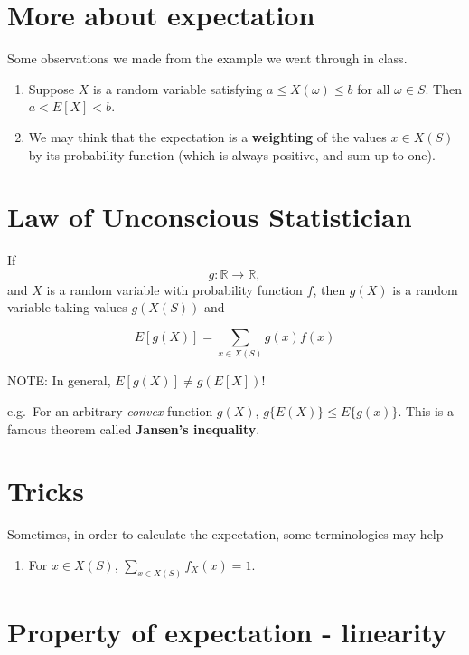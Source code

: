 \documentclass[
]{book}
\providecommand{\tightlist}{%
  \setlength{\itemsep}{0pt}\setlength{\parskip}{0pt}}
\theoremstyle{definition}
\theoremstyle{definition}
\theoremstyle{definition}
\theoremstyle{definition}
\theoremstyle{remark}
\begin{document}
\hypertarget{more-about-expectation}{%
\section{More about expectation}\label{more-about-expectation}}

Some observations we made from the example we went through in class.

\begin{enumerate}
\def\labelenumi{\arabic{enumi}.}
\item
  Suppose \(X\) is a random variable satisfying \(a \le X(\omega) \le b\) for all \(\omega \in S\). Then \(a<E[X]<b\).
\item
  We may think that the expectation is a \textbf{weighting} of the values \(x\in X(S)\) by its probability function (which is always positive, and sum up to one).
\end{enumerate}

\hypertarget{law-of-unconscious-statistician}{%
\section{Law of Unconscious Statistician}\label{law-of-unconscious-statistician}}

If
\[
g: {\mathbb R} \to {\mathbb R},
\]
and \(X\) is a random variable with probability function \(f\), then \(g(X)\) is a random variable taking values \(g(X(S))\) and

\[
E[g(X)] = \sum_{x \in X(S)} g(x) f(x)
\]

NOTE: In general, \(E[g(X)]\ne g(E[X])\)!

e.g.~For an arbitrary \emph{convex} function \(g(X)\), \(g\{E(X)\} \le E\{g(x)\}\). This is a famous theorem called \textbf{Jansen's inequality}.

\hypertarget{tricks}{%
\section{Tricks}\label{tricks}}

Sometimes, in order to calculate the expectation, some terminologies may help

\begin{enumerate}
\def\labelenumi{\arabic{enumi}.}
\tightlist
\item
  For \(x\in X(S)\), \(\sum_{x\in X(S)} f_X(x)=1\).
\end{enumerate}

\hypertarget{property-of-expectation---linearity}{%
\section{Property of expectation - linearity}\label{property-of-expectation---linearity}}
\end{document}
